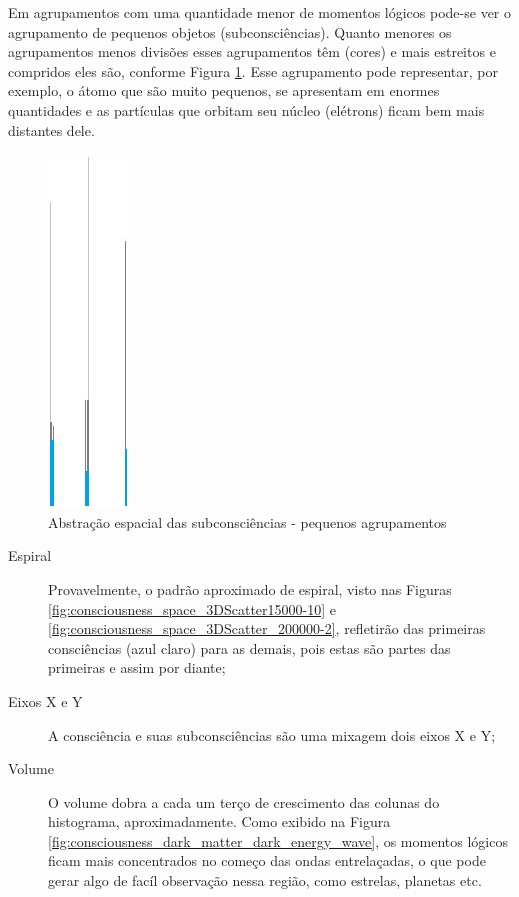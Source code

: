 Em agrupamentos com uma quantidade menor de momentos lógicos pode-se ver o agrupamento de pequenos objetos (subconsciências). Quanto menores os agrupamentos menos divisões esses agrupamentos têm (cores) e mais estreitos e compridos eles são, conforme Figura \ref{fig:consciousness_space_subconsciousness_min}. Esse agrupamento pode representar, por exemplo, o átomo que são muito pequenos, se apresentam em enormes quantidades e as partículas que orbitam seu núcleo (elétrons) ficam bem mais distantes dele.
\begin{figure}[H]
\caption{Abstração espacial das subconsciências - pequenos agrupamentos}
\label{fig:consciousness_space_subconsciousness_min}
\centering
\includegraphics[scale=.9]{sections/images/consciousness_space_subconsciousness_min.jpg}
\end{figure}

\begin{description}
   \item[Espiral] Provavelmente, o padrão aproximado de espiral, visto nas Figuras \ref{fig:consciousness_space_3DScatter15000-10} e \ref{fig:consciousness_space_3DScatter_200000-2}, refletirão das primeiras consciências (azul claro) para as demais, pois estas são partes das primeiras e assim por diante;
   \item[Eixos X e Y] A consciência e suas subconsciências são uma mixagem dois eixos X e Y;
   \item[Volume] O volume dobra a cada um terço de crescimento das colunas do histograma, aproximadamente. Como exibido na Figura \ref{fig:consciousness_dark_matter_dark_energy_wave}, os momentos lógicos ficam mais concentrados no começo das ondas entrelaçadas, o que pode gerar algo de facíl observação nessa região, como estrelas, planetas etc. 
\end{description}

